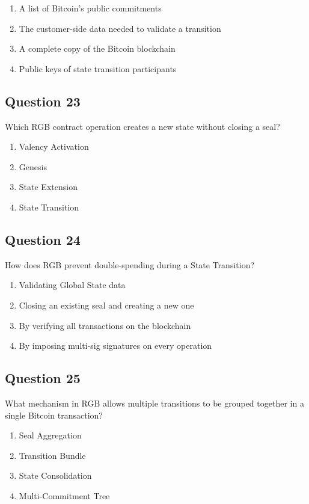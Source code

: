 \documentclass[12pt,a4paper]{article}
\begin{document}
\begin{enumerate}[label=\Alph*., leftmargin=*]
\item A list of Bitcoin's public commitments
\item The customer-side data needed to validate a transition
\item A complete copy of the Bitcoin blockchain
\item Public keys of state transition participants
\end{enumerate}

\bigskip


\subsection*{Question 23}
Which RGB contract operation creates a new state without closing a seal?

\begin{enumerate}[label=\Alph*., leftmargin=*]
\item Valency Activation
\item Genesis
\item State Extension
\item State Transition
\end{enumerate}

\bigskip


\subsection*{Question 24}
How does RGB prevent double-spending during a State Transition?

\begin{enumerate}[label=\Alph*., leftmargin=*]
\item Validating Global State data
\item Closing an existing seal and creating a new one
\item By verifying all transactions on the blockchain
\item By imposing multi-sig signatures on every operation
\end{enumerate}

\bigskip


\subsection*{Question 25}
What mechanism in RGB allows multiple transitions to be grouped together in a single Bitcoin transaction?

\begin{enumerate}[label=\Alph*., leftmargin=*]
\item Seal Aggregation
\item Transition Bundle
\item State Consolidation
\item Multi-Commitment Tree
\end{enumerate}
\end{document}
